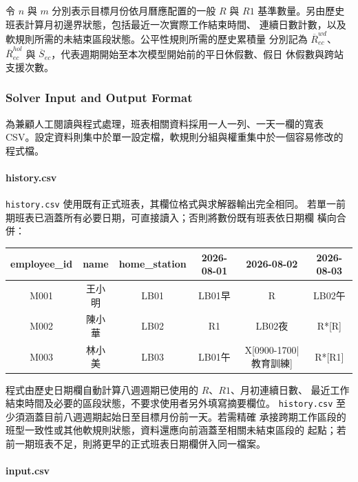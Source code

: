 \documentclass[12pt]{article}
\begin{document}
令 \(n\) 與 \(m\) 分別表示目標月份依月曆應配置的一般 \(R\) 與 \(R1\)
基準數量。另由歷史班表計算月初邊界狀態，包括最近一次實際工作結束時間、
連續日數計數，以及軟規則所需的未結束區段狀態。公平性規則所需的歷史累積量
分別記為 \(\overline{R}^{wd}_{ec}\)、\(\overline{R}^{hol}_{ec}\) 與
\(\overline{S}_{ec}\)，代表週期開始至本次模型開始前的平日休假數、假日
休假數與跨站支援次數。

\subsubsection{Solver Input and Output Format}

為兼顧人工閱讀與程式處理，班表相關資料採用一人一列、一天一欄的寬表
CSV。設定資料則集中於單一設定檔，軟規則分組與權重集中於一個容易修改的
程式檔。

\paragraph{history.csv}

\texttt{history.csv} 使用既有正式班表，其欄位格式與求解器輸出完全相同。
若單一前期班表已涵蓋所有必要日期，可直接讀入；否則將數份既有班表依日期欄
橫向合併：

\begin{center}
  \footnotesize
  \begin{tabular}{|c|c|c|c|c|c|}
    \hline
    employee\_id & name & home\_station & 2026-08-01 & 2026-08-02 & 2026-08-03 \\
    \hline
    M001 & 王小明 & LB01 & LB01早 & R & LB02午 \\
    \hline
    M002 & 陳小華 & LB02 & R1 & LB02夜 & R*[R] \\
    \hline
    M003 & 林小美 & LB03 & LB01午 & X[0900-1700|教育訓練] & R*[R1] \\
    \hline
  \end{tabular}
\end{center}

程式由歷史日期欄自動計算八週週期已使用的 \(R\)、\(R1\)、月初連續日數、
最近工作結束時間及必要的區段狀態，不要求使用者另外填寫摘要欄位。
\texttt{history.csv} 至少須涵蓋目前八週週期起始日至目標月份前一天。若需精確
承接跨期工作區段的班型一致性或其他軟規則狀態，資料還應向前涵蓋至相關未結束區段的
起點；若前一期班表不足，則將更早的正式班表日期欄併入同一檔案。

\paragraph{input.csv}
\end{document}
